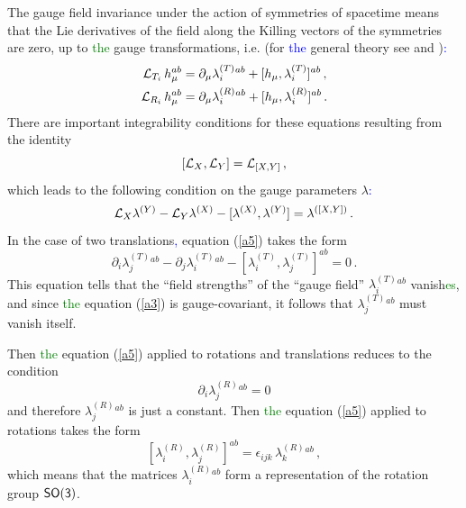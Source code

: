 \documentclass[prd,reprint,eqsecnum,nofootinbib]{revtex4-1}
\begin{document}
The gauge field invariance under the action of symmetries of
spacetime means that the Lie derivatives of the field along the
Killing vectors of the symmetries are zero, up to \textcolor{green}{the} gauge
transformations, i.e. (for \textcolor{blue}{the} general theory see \cite{Forgacs:1979zs}
and \cite{Jackiw:1979ub})\textcolor{blue}{:}
\begin{align}
    {\cal L}_{T_i}\,h_\mu^{ab} &= \partial_\mu \lambda^{(T)}_i{}^{ab}
    + [h_\mu,\lambda^{(T)}_i]^{ab}\,,\label{a3}\\  {\cal L}_{R_i}\,h_\mu^{ab} &= \partial_\mu \lambda^{(R)}_i{}^{ab}
    + [h_\mu,\lambda^{(R)}_i]^{ab}\,.\label{a4}
\end{align}
There are important integrability conditions for these equations
resulting from the identity
$$
[{\cal L}_X, {\cal L}_Y] = {\cal L}_{[X,Y]}\, ,
$$
which leads to the following condition on the gauge parameters
$\lambda$\textcolor{blue}{:}
\begin{equation}\label{a5}
{\cal L}_X\lambda^{(Y)}-{\cal L}_Y\lambda^{(X)}
-[\lambda^{(X)},\lambda^{(Y)}] =\lambda^{([X,Y])}\,.
\end{equation}
In the case of two translations\textcolor{blue}{,} equation (\ref{a5}) takes the form
\begin{equation}\label{a6}
    \partial_i\lambda^{(T)}_j{}^{ab}-
    \partial_j\lambda^{(T)}_i{}^{ab} -
    [\lambda^{(T)}_i,\lambda^{(T)}_j]^{ab}=0\, .
\end{equation}
This equation tells that the ``field strengths'' of the ``gauge
field'' $\lambda^{(T)}_i{}^{ab}$ vanish\textcolor{green}{es}, and since \textcolor{green}{the} equation
(\ref{a3}) is gauge-covariant, it follows that
$\lambda^{(T)}_j{}^{ab}$ must vanish itself.

Then \textcolor{green}{the} equation (\ref{a5}) applied to rotations and translations
reduces to the condition
$$
\partial_i\lambda^{(R)}_j{}^{ab}=0
$$
and therefore $\lambda^{(R)}_j{}^{ab}$ is just a constant. Then \textcolor{green}{the}
equation (\ref{a5}) applied to rotations takes the form
\begin{equation}\label{a7}
    [\lambda^{(R)}_i,\lambda^{(R)}_j]^{ab}=\epsilon_{ijk}\,
    \lambda^{(R)}_k{}^{ab}\,,
\end{equation}
which means that the matrices $\lambda^{(R)}_i{}^{ab}$ form a
representation of the rotation group $\sf{SO(3)}$.
\end{document}
